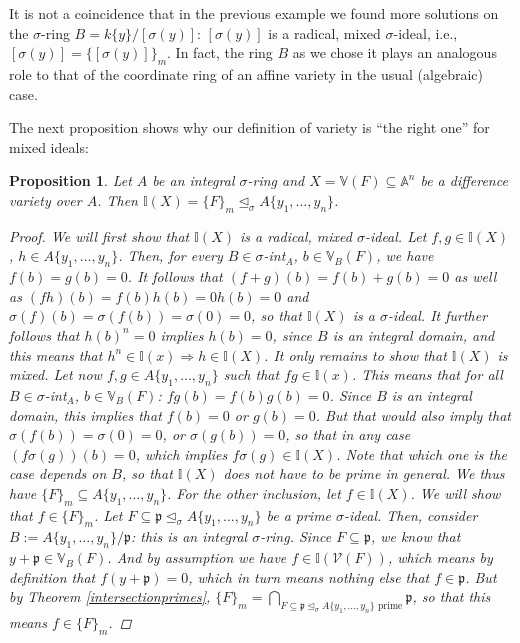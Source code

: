 \documentclass{article}
\def\I{\mathbb{I}}
\def\V{\mathcal{V}}
\def\VV{\mathbb{V}}
\def\p{\mathfrak{p}}
\def\s{\sigma}
\def\si{\unlhd_{\sigma}}
\newenvironment{bew}{\begin{proof}[Proof]}{\end{proof}}
\theoremstyle{plain}
\newtheorem{prop}[Satz]{Proposition}
\theoremstyle{definition}
\begin{document}
It is not a coincidence that in the previous example we found more solutions on the $\s$-ring $B = k\{y\}/[\s(y)]$: $[\s(y)]$ is a radical, mixed $\s$-ideal, i.e., $[\s(y)] = \{ [\s(y)] \}_m$.
In fact, the ring $B$ as we chose it plays an analogous role to that of the coordinate ring of an affine variety in the usual (algebraic) case.

The next proposition shows why our definition of variety is ``the right one'' for mixed ideals:

\begin{prop}\label{I=F_m}
Let $A$ be an integral $\s$-ring and $X = \VV(F) \subseteq \mathbb{A}^n$ be a difference variety over $A$. Then $\I(X) = \{F\}_m \si A\{y_1,\ldots,y_n\}$. 
\begin{bew}
We will first show that $\I(X)$ is a radical, mixed $\s$-ideal.
Let $f, g \in \I(X)$, $h \in A\{y_1,\ldots,y_n\}$. Then, for every $B \in \s$-int$_A$, $b \in \VV_B(F)$, we have $f(b) = g(b) = 0$.
It follows that $(f + g)(b) = f(b) + g(b) = 0$ as well as $(fh)(b) = f(b)h(b) = 0 h(b) = 0$ and $\s(f)(b) = \s(f(b)) = \s(0) = 0$, so that $\I(X)$ is a $\s$-ideal.
It further follows that $h(b)^n = 0$ implies $h(b) = 0$, since $B$ is an integral domain, and this means that $h^n \in \I(x) \Rightarrow h \in \I(X)$. It only remains to show that $\I(X)$ is mixed.
Let now $f,g \in A\{y_1,\ldots,y_n\}$ such that $fg \in \I(x)$. This means that for all  $B \in \s$-int$_A$, $b \in \VV_B(F)$: $fg(b) = f(b) g(b) = 0$. Since $B$ is an integral domain,
this implies that $f(b) = 0$ or $g(b) = 0$. But that would also imply that $\s(f(b)) = \s(0) = 0$, or $\s(g(b)) = 0$, so that in any case $(f\s(g))(b) = 0$, which implies $f\s(g) \in \I(X)$.
Note that which one is the case depends on $B$, so that $\I(X)$ does not have to be prime in general. We thus have $\{F\}_m \subseteq A\{y_1,\ldots,y_n\}$. For the other inclusion, let $f \in \I(X)$. We will show that $f \in \{F\}_m$. Let $F \subseteq \p \si A\{y_1,\ldots,y_n\}$ be a prime $\s$-ideal.
Then, consider $B:= A\{y_1,\ldots,y_n\}/\p$: this is an integral $\s$-ring. Since $F \subseteq \p$, we know that $y + \p \in \VV_B(F)$. And by assumption we have $f \in \I(\V(F))$, which means by definition that $f(y + \p) = 0$, which
in turn means nothing else that $f \in \p$. But by Theorem \ref{intersectionprimes}, $\{F\}_m = \bigcap_{F \subseteq \p \si A\{y_1,\ldots,y_n\} \text{ prime}} \p$, so that this means $f \in \{F\}_m$.
\end{bew}
\end{prop}
\end{document}
